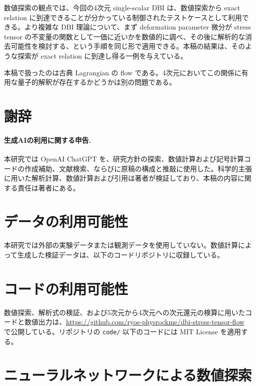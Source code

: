\documentclass[a4paper,11pt]{ltjsarticle}
\numberwithin{equation}{section}
\begin{document}
数値探索の観点では、今回の4次元 single-scalar DBI は、数値探索から exact relation に到達できることが分かっている制御されたテストケースとして利用できる。より複雑な DBI 理論について、まず deformation parameter 微分が stress tensor の不変量の関数として一価に近いかを数値的に調べ、その後に解析的な消去可能性を検討する、という手順を同じ形で適用できる。本稿の結果は、そのような探索が exact relation に到達し得る一例を与えている。

本稿で扱ったのは古典 Lagrangian の flow である。4次元においてこの関係に有用な量子的解釈が存在するかどうかは別の問題である。

\section*{謝辞}
\paragraph{生成AIの利用に関する申告.} 本研究では OpenAI ChatGPT を、研究方針の探索、数値計算および記号計算コードの作成補助、文献検索、ならびに原稿の構成と推敲に使用した。科学的主張に用いた解析計算、数値計算および引用は著者が検証しており、本稿の内容に関する責任は著者にある。

\section*{データの利用可能性}
本研究では外部の実験データまたは観測データを使用していない。数値計算によって生成した検証データは、以下のコードリポジトリに収録している。

\section*{コードの利用可能性}
数値探索、解析式の検証、および5次元から4次元への次元還元の検算に用いたコードと数値出力は、\url{https://github.com/ryos-physrockme/dbi-stress-tensor-flow} で公開している。リポジトリの \texttt{code/} 以下のコードには MIT License を適用する。

\appendix

\section{ニューラルネットワークによる数値探索}
\label{app:numerical-search}
\end{document}

